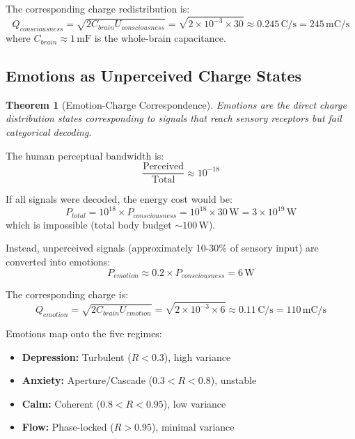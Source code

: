 \documentclass[12pt,a4paper]{article}
\newtheorem{theorem}{Theorem}[section]
\begin{document}
The corresponding charge redistribution is:
\begin{equation}
Q_{consciousness} = \sqrt{2 C_{brain} U_{consciousness}} = \sqrt{2 \times 10^{-3} \times 30} \approx 0.245 \, \text{C/s} = 245 \, \text{mC/s}
\end{equation}
where $C_{brain} \approx 1 \, \text{mF}$ is the whole-brain capacitance.

\subsection{Emotions as Unperceived Charge States}

\begin{theorem}[Emotion-Charge Correspondence]
Emotions are the direct charge distribution states corresponding to signals that reach sensory receptors but fail categorical decoding.
\end{theorem}

The human perceptual bandwidth is:
\begin{equation}
\frac{\text{Perceived}}{\text{Total}} \approx 10^{-18}
\end{equation}

If all signals were decoded, the energy cost would be:
\begin{equation}
P_{total} = 10^{18} \times P_{consciousness} = 10^{18} \times 30 \, \text{W} = 3 \times 10^{19} \, \text{W}
\end{equation}
which is impossible (total body budget $\sim 100 \, \text{W}$).

Instead, unperceived signals (approximately 10-30\% of sensory input) are converted into emotions:
\begin{equation}
P_{emotion} \approx 0.2 \times P_{consciousness} = 6 \, \text{W}
\end{equation}

The corresponding charge is:
\begin{equation}
Q_{emotion} = \sqrt{2 C_{brain} U_{emotion}} = \sqrt{2 \times 10^{-3} \times 6} \approx 0.11 \, \text{C/s} = 110 \, \text{mC/s}
\end{equation}

Emotions map onto the five regimes:
\begin{itemize}
\item \textbf{Depression:} Turbulent ($R < 0.3$), high variance
\item \textbf{Anxiety:} Aperture/Cascade ($0.3 < R < 0.8$), unstable
\item \textbf{Calm:} Coherent ($0.8 < R < 0.95$), low variance
\item \textbf{Flow:} Phase-locked ($R > 0.95$), minimal variance
\end{itemize}
\end{document}
